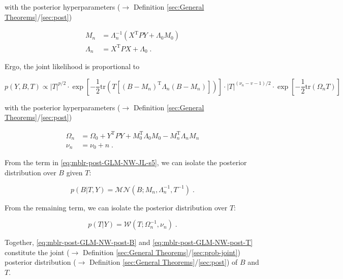 \documentclass[a4paper,12pt,twoside]{book}
\begin{document}
with the posterior hyperparameters ($\rightarrow$ Definition \ref{sec:General Theorems}/\ref{sec:post})

\begin{equation} \label{eq:mblr-post-GLM-NW-post-B-par}
\begin{split}
M_n &= \Lambda_n^{-1} (X^\mathrm{T} P Y + \Lambda_0 M_0) \\
\Lambda_n &= X^\mathrm{T} P X + \Lambda_0 \; .
\end{split}
\end{equation}

Ergo, the joint likelihood is proportional to

\begin{equation} \label{eq:mblr-post-GLM-NW-JL-s5}
p(Y,B,T) \propto |T|^{p/2} \cdot \exp\left[ -\frac{1}{2} \mathrm{tr}\left( T \left[ (B-M_n)^\mathrm{T} \Lambda_n (B-M_n) \right] \right) \right] \cdot |T|^{(\nu_n-v-1)/2} \cdot \exp\left[ -\frac{1}{2} \mathrm{tr}\left( \Omega_n T \right) \right]
\end{equation}

with the posterior hyperparameters ($\rightarrow$ Definition \ref{sec:General Theorems}/\ref{sec:post})

\begin{equation} \label{eq:mblr-post-GLM-NW-post-T-par}
\begin{split}
\Omega_n &= \Omega_0 + Y^\mathrm{T} P Y + M_0^\mathrm{T} \Lambda_0 M_0 - M_n^\mathrm{T} \Lambda_n M_n \\
\nu_n &= \nu_0 + n \; .
\end{split}
\end{equation}

From the term in \eqref{eq:mblr-post-GLM-NW-JL-s5}, we can isolate the posterior distribution over $B$ given $T$:

\begin{equation} \label{eq:mblr-post-GLM-NW-post-B}
p(B|T,Y) = \mathcal{MN}(B; M_n, \Lambda_n^{-1}, T^{-1}) \; .
\end{equation}

From the remaining term, we can isolate the posterior distribution over $T$:

\begin{equation} \label{eq:mblr-post-GLM-NW-post-T}
p(T|Y) = \mathcal{W}(T; \Omega_n^{-1}, \nu_n) \; .
\end{equation}

Together, \eqref{eq:mblr-post-GLM-NW-post-B} and \eqref{eq:mblr-post-GLM-NW-post-T} constitute the joint ($\rightarrow$ Definition \ref{sec:General Theorems}/\ref{sec:prob-joint}) posterior distribution ($\rightarrow$ Definition \ref{sec:General Theorems}/\ref{sec:post}) of $B$ and $T$.
\end{document}
